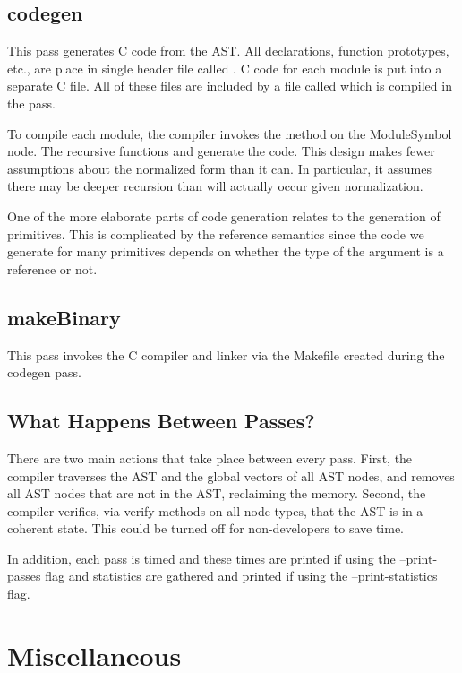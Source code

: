 \documentclass[10pt]{article}
\begin{document}
\subsection{codegen}

This pass generates C code from the AST.  All declarations, function
prototypes, etc., are place in single header file called
.  C code for each module is put into a separate C
file.  All of these files are included by a file called 
which is compiled in the  pass.

To compile each module, the compiler invokes the 
method on the ModuleSymbol node.  The recursive functions
 and  generate the code.  This design makes
fewer assumptions about the normalized form than it can.  In
particular, it assumes there may be deeper recursion than will
actually occur given normalization.

One of the more elaborate parts of code generation relates to the
generation of primitives.  This is complicated by the reference
semantics since the code we generate for many primitives depends on
whether the type of the argument is a reference or not.

\subsection{makeBinary}

This pass invokes the C compiler and linker via the Makefile created
during the codegen pass.

\subsection{What Happens Between Passes?}
\label{sec:betweenpasses}

There are two main actions that take place between every pass.  First,
the compiler traverses the AST and the global vectors of all AST
nodes, and removes all AST nodes that are not in the AST, reclaiming
the memory.  Second, the compiler verifies, via verify methods on all
node types, that the AST is in a coherent state.  This could be turned
off for non-developers to save time.

In addition, each pass is timed and these times are printed if using
the --print-passes flag and statistics are gathered and printed if
using the --print-statistics flag.

\section{Miscellaneous}
\label{sec:misc}
\end{document}
